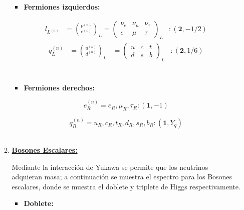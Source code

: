 \documentclass[12pt]{article}
\begin{document}
\begin{enumerate}
\begin{enumerate}
\begin{itemize}
\item \textbf{Fermiones izquierdos:} 
\end{itemize}

\begin{equation}
\begin{aligned}
      l_{L^{(n)}} & = \binom{\nu^{(n)}}{e^{(n)}}_L = \begin{pmatrix}  \nu_e & \nu_\mu & \nu_\tau \\ e &  \mu &  \tau \end{pmatrix}_L & :  (\textbf{2}, -1/2)  
\end{aligned}
\end{equation}
\begin{equation}
\begin{aligned}
   q_L^{(n)} & = \binom{u^{(n)}}{d^{(n)}}_L  & = \begin{pmatrix} u & c & t \\ d &  s  &  b \end{pmatrix}_L & :  (\textbf{2}, 1/6) \\ 
\end{aligned}
\end{equation} \\

\begin{itemize}
\item \textbf{Fermiones derechos:}
\end{itemize} 

\begin{equation}
 e_R^{(n)} = e_R, \mu_R , \tau_R: (\textbf{1}, -1)
\end{equation}

\begin{equation}
 q_R^{(n)} = u_R, c_R , t_R, d_R, s_R, b_R   : (\textbf{1}, Y_q)
\end{equation} \\ 



\item\underline{ \textbf{Bosones Escalares:}}

Mediante la interacción de Yukawa se permite que los neutrinos adquieran masa; a continuación se muestra el espectro para los Bosones escalares, donde se muestra el doblete y triplete de Higgs respectivamente. 


\begin{itemize}
\item \textbf{Doblete:}
\end{itemize}


\end{enumerate}
\end{enumerate}
\end{document}
